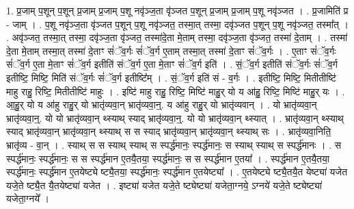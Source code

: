 \documentclass[17pt]{extarticle}
\begin{document}
1. प्र॒जाम् प॒शून् प॒शून् प्र॒जाम् प्र॒जाम् प॒शू नवृ॑ञ्ज॒ता वृ॑ञ्जत प॒शून् प्र॒जाम् प्र॒जाम् प॒शू नवृ॑ञ्जत । . प्र॒जामिति॑ प्र - जाम् । . प॒शू नवृ॑ञ्ज॒ता वृ॑ञ्जत प॒शून् प॒शू नवृ॑ञ्जत॒ तस्मा॒त् तस्मा॒ दवृ॑ञ्जत प॒शून् प॒शू नवृ॑ञ्जत॒ तस्मा᳚त् । . अवृ॑ञ्जत॒ तस्मा॒त् तस्मा॒ दवृ॑ञ्ज॒ता वृ॑ञ्जत॒ तस्मा॑दे॒ता मे॒ताम् तस्मा॒ दवृ॑ञ्ज॒ता वृ॑ञ्जत॒ तस्मा॑ दे॒ताम् । . तस्मा॑ दे॒ता मे॒ताम् तस्मा॒त् तस्मा॑ दे॒ताꣳ सं॑ॅव॒र्गः सं॑ॅव॒र्ग ए॒ताम् तस्मा॒त् तस्मा॑ दे॒ताꣳ सं॑ॅव॒र्गः । . ए॒ताꣳ सं॑ॅव॒र्गः सं॑ॅव॒र्ग ए॒ता मे॒ताꣳ सं॑ॅव॒र्ग इतीति॑ संॅव॒र्ग ए॒ता मे॒ताꣳ सं॑ॅव॒र्ग इति॑ । . सं॒ॅव॒र्ग इतीति॑ संॅव॒र्गः सं॑ॅव॒र्ग इतीष्टि॒ मिष्टि॒ मिति॑ संॅव॒र्गः सं॑ॅव॒र्ग इतीष्टि᳚म् । . सं॒ॅव॒र्ग इति॑ सं - व॒र्गः । . इतीष्टि॒ मिष्टि॒ मितीतीष्टि॑ माहु राहु॒ रिष्टि॒ मितीतीष्टि॑ माहुः । . इष्टि॑ माहु राहु॒ रिष्टि॒ मिष्टि॑ माहु॒र् यो य आ॑हु॒ रिष्टि॒ मिष्टि॑ माहु॒र् यः । . आ॒हु॒र् यो य आ॑हु राहु॒र् यो भ्रातृ॑व्यवा॒न् भ्रातृ॑व्यवा॒न्॒. य आ॑हु राहु॒र् यो भ्रातृ॑व्यवान् । . यो भ्रातृ॑व्यवा॒न् भ्रातृ॑व्यवा॒न्॒. यो यो भ्रातृ॑व्यवा॒न् थ्स्याथ् स्याद् भ्रातृ॑व्यवा॒न्॒. यो यो भ्रातृ॑व्यवा॒न् थ्स्यात् । . भ्रातृ॑व्यवा॒न् थ्स्याथ् स्याद् भ्रातृ॑व्यवा॒न् भ्रातृ॑व्यवा॒न् थ्स्याथ् स स स्याद् भ्रातृ॑व्यवा॒न् भ्रातृ॑व्यवा॒न् थ्स्याथ् सः । . भ्रातृ॑व्यवा॒निति॒ भ्रातृ॑व्य - वा॒न् । . स्याथ् स स स्याथ् स्याथ् स स्पर्द्ध॑मानः॒ स्पर्द्ध॑मानः॒ स स्याथ् स्याथ् स स्पर्द्ध॑मानः । . स स्पर्द्ध॑मानः॒ स्पर्द्ध॑मानः॒ स स स्पर्द्ध॑मान ए॒तयै॒तया॒ स्पर्द्ध॑मानः॒ स स स्पर्द्ध॑मान ए॒तया᳚ । . स्पर्द्ध॑मान ए॒तयै॒तया॒ स्पर्द्ध॑मानः॒ स्पर्द्ध॑मान ए॒तयेष्ट्ये ष्ट्यै॒तया॒ स्पर्द्ध॑मानः॒ स्पर्द्ध॑मान ए॒तयेष्ट्या᳚ । . ए॒तयेष्ट्ये ष्ट्यै॒तयै॒त येष्ट्या॑ यजेत यजे॒ते ष्ट्यै॒त यै॒तयेष्ट्या॑ यजेत । . इष्ट्या॑ यजेत यजे॒ते ष्ट्येष्ट्या॑ यजेता॒ग्नये॒ ऽग्नये॑ यजे॒ते ष्ट्येष्ट्या॑ यजेता॒ग्नये᳚ । \newline
\end{document}
